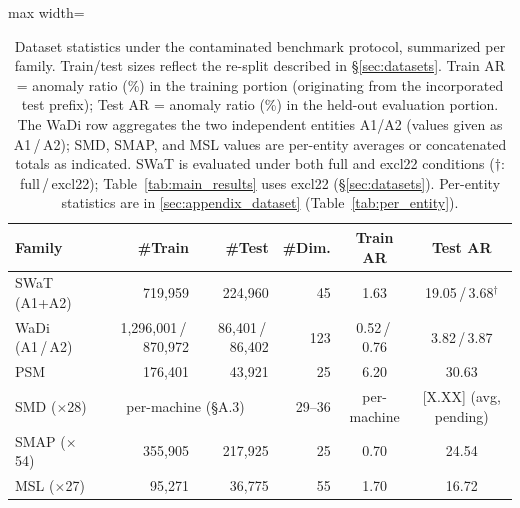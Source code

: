 \begin{table}[t]
\scriptsize
\centering
\caption{Dataset statistics under the contaminated benchmark protocol, summarized per family.
  Train/test sizes reflect the re-split described in \S\ref{sec:datasets}.
  Train AR = anomaly ratio (\%) in the training portion (originating from the incorporated
  test prefix); Test AR = anomaly ratio (\%) in the held-out evaluation portion.
  The WaDi row aggregates the two independent entities A1/A2 (values given as A1\,/\,A2);
  SMD, SMAP, and MSL values are per-entity averages or concatenated totals as indicated.
  SWaT is evaluated under both full and excl22 conditions ($\dagger$: full\,/\,excl22);
  Table~\ref{tab:main_results} uses excl22 (\S\ref{sec:datasets}).
  Per-entity statistics are in \ref{sec:appendix_dataset} (Table~\ref{tab:per_entity}).}
\label{tab:datasets}
\setlength{\tabcolsep}{2pt}
\begin{adjustbox}{max width=\linewidth}
\begin{tabular}{lrrrcc@{}}
\toprule
Family & \#Train & \#Test & \#Dim. & Train AR & Test AR \\
\midrule
SWaT (A1+A2) & 719{,}959 & 224{,}960 & 45 & 1.63 & 19.05\,/\,3.68$^{\dagger}$ \\
WaDi (A1\,/\,A2) & 1{,}296{,}001\,/\,870{,}972 & 86{,}401\,/\,86{,}402 & 123 & 0.52\,/\,0.76 & 3.82\,/\,3.87 \\
PSM & 176{,}401 & 43{,}921 & 25 & 6.20 & 30.63 \\
SMD ($\times$28) & \multicolumn{2}{c}{per-machine (\S A.3)} & 29--36 & per-machine & [X.XX] (avg, pending) \\
SMAP ($\times$54) & 355{,}905 & 217{,}925 & 25 & 0.70 & 24.54 \\
MSL ($\times$27) & 95{,}271 & 36{,}775 & 55 & 1.70 & 16.72 \\
\bottomrule
\end{tabular}
\end{adjustbox}
\end{table}

